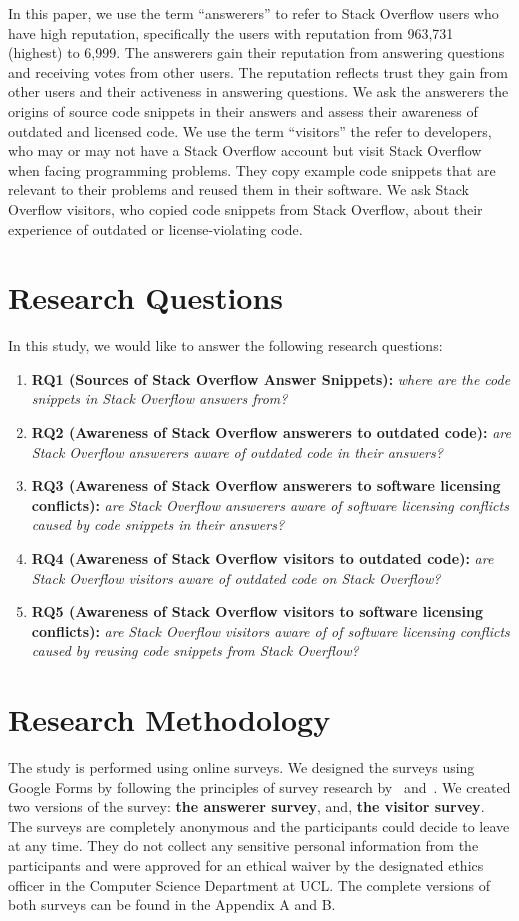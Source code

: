 \documentclass{svjour3}                     %
\begin{document}
In this paper, we use the term ``answerers'' to refer to Stack Overflow users
who have high reputation, specifically the users with reputation from 963,731
(highest)  to 6,999. The answerers gain their reputation from answering
questions and receiving votes from other users. The reputation reflects trust
they gain from other users and their activeness in answering questions. We ask
the answerers the origins of source code snippets in their answers  and assess
their awareness of outdated and licensed code. We use the term ``visitors'' the
refer to developers, who may or may not have a Stack Overflow account but visit
Stack Overflow when facing programming problems. They copy example code snippets
that are relevant to their problems and reused them in their software. 
We ask Stack Overflow visitors, who copied code snippets from
Stack Overflow, about their experience of outdated or license-violating code.

\section{Research Questions}
In this study, we would like to answer the following
research questions:

\begin{enumerate}
	\item \textbf{RQ1 (Sources of Stack Overflow Answer Snippets):} \textit{where are the code snippets in Stack Overflow answers from?}
	\item \textbf{RQ2 (Awareness of Stack Overflow answerers to outdated code):} \textit{are Stack Overflow answerers aware of outdated code in their answers?}
	\item \textbf{RQ3 (Awareness of Stack Overflow answerers to software licensing conflicts):} \textit{are Stack Overflow answerers aware of software licensing conflicts caused by code snippets in their answers?}
	\item \textbf{RQ4 (Awareness of Stack Overflow visitors to outdated code):} \textit{are Stack Overflow visitors aware of outdated code on Stack Overflow?}
	\item \textbf{RQ5 (Awareness of Stack Overflow visitors to software licensing conflicts):} \textit{are Stack Overflow visitors aware of of software licensing conflicts caused by reusing code snippets from Stack Overflow?}
\end{enumerate}

\section{Research Methodology}
The study is performed using online surveys. We designed the surveys using
Google Forms by following the principles of survey research
by~\cite{Pfleeger2001} and~\cite{Kitchenham2002}. We created two versions of the
survey: \textbf{the answerer survey}, and, \textbf{the visitor survey}. The
surveys are completely anonymous and the participants could decide to leave at
any time. They do not collect any sensitive personal information from the
participants and were approved for an ethical waiver by the designated ethics
officer in the Computer Science Department at UCL.  The complete versions of
both surveys can be found in the Appendix A and B.
\end{document}
